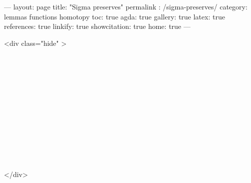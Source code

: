 ---
layout: page
title: "Sigma preserves"
permalink : /sigma-preserves/
category: lemmas functions homotopy
toc: true
agda: true
gallery: true
latex: true
references: true
linkify: true
showcitation: true
home: true
---

<div class="hide" >
\begin{code}%
\>[0]\AgdaSymbol{\{-\#}\AgdaSpace{}%
\AgdaSpace{}%
\AgdaSpace{}%
\AgdaSymbol{\#-\}}\<%
\\
\>[0]\AgdaSpace{}%
\AgdaModule{\AgdaUnderscore{}}\AgdaSpace{}%
\<%
\\
%
\\[\AgdaEmptyExtraSkip]%
\>[0]\AgdaSpace{}%
\AgdaSpace{}%
\<%
\\
\>[0]\AgdaSpace{}%
\AgdaSpace{}%
\<%
\\
%
\\[\AgdaEmptyExtraSkip]%
\>[0]\AgdaSpace{}%
\AgdaSpace{}%
\<%
\\
\>[0]\AgdaSpace{}%
\AgdaSpace{}%
\<%
\\
%
\\[\AgdaEmptyExtraSkip]%
\>[0]\AgdaSpace{}%
\AgdaSpace{}%
\<%
\\
\>[0]\AgdaSpace{}%
\AgdaSpace{}%
\<%
\\
\>[0]\AgdaSpace{}%
\AgdaSpace{}%
\<%
\end{code}
</div>

